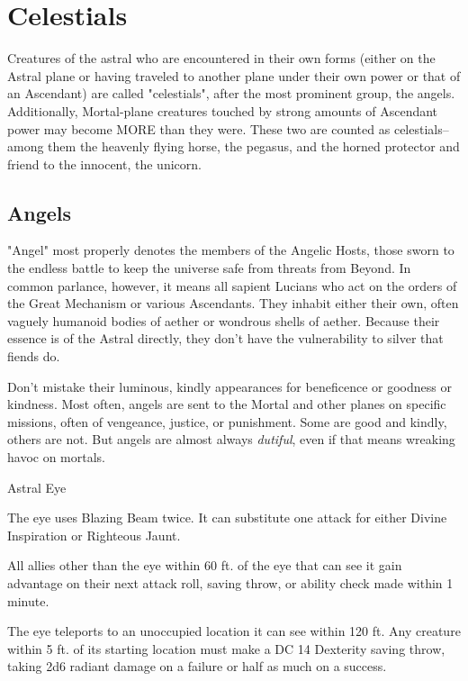 \FloatBarrier
\section{Celestials}
Creatures of the astral who are encountered in their own forms (either on the Astral plane or having traveled to another plane under their own power or that of an Ascendant) are called "celestials", after the most prominent group, the angels. Additionally, Mortal-plane creatures touched by strong amounts of Ascendant power may become MORE than they were. These two are counted as celestials--among them the heavenly flying horse, the pegasus, and the horned protector and friend to the innocent, the unicorn.
\subsection{Angels}
"Angel" most properly denotes the members of the Angelic Hosts, those sworn to the endless battle to keep the universe safe from threats from Beyond. In common parlance, however, it means all sapient Lucians who act on the orders of the Great Mechanism or various Ascendants. They inhabit either their own, often vaguely humanoid bodies of aether or wondrous shells of aether. Because their essence is of the Astral directly, they don't have the vulnerability to silver that fiends do.

Don't mistake their luminous, kindly appearances for beneficence or goodness or kindness. Most often, angels are sent to the Mortal and other planes on specific missions, often of vengeance, justice, or punishment. Some are good and kindly, others are not. But angels are almost always \textit{dutiful}, even if that means wreaking havoc on mortals.

\begin{DndMonster}{Astral Eye}
	\DndMonsterBasics[armor-class={14}, hit-points={45}, speed={0 ft., fly 50 ft. (hover)}]
	\DndMonsterDetails[skills={Perception +9}, damage-resistances={fire, radiant}, senses={truesight 60 ft., blindsight 60 ft., passive Perception 19}, languages={all, telepathy 60 ft.}, challenge={3:1}]
	
	
	 The eye uses Blazing Beam twice. It can substitute one attack for either Divine Inspiration or Righteous Jaunt.
	
	\DndMonsterAttack[
		name=Blazing Beam,
		distance=ranged,
		type=spell,
		mod=+6,
		range=120 ft.,
		dmg=\DndDice{1d6+4},
		dmg-type=radiant
	]
	 All allies other than the eye within 60 ft. of the eye that can see it gain advantage on their next attack roll, saving throw, or ability check made within 1 minute.
	
	 The eye teleports to an unoccupied location it can see within 120 ft. Any creature within 5 ft. of its starting location must make a DC 14 Dexterity saving throw, taking 2d6 radiant damage on a failure or half as much on a success. 
\end{DndMonster}


